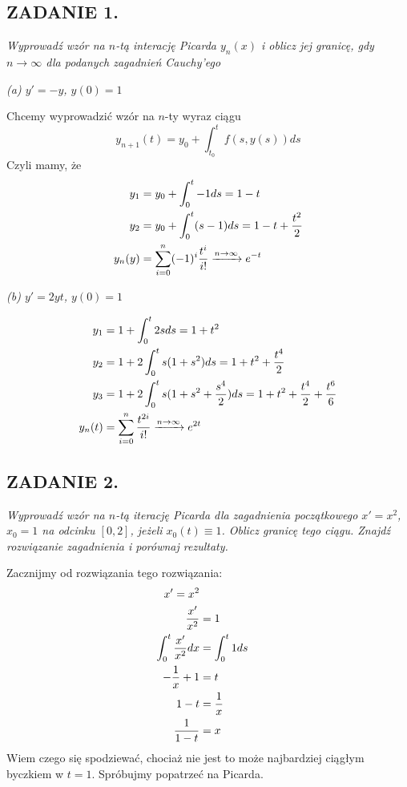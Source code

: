 \documentclass{article}
\begin{document}
\subsection*{ZADANIE 1.}
\emph{\color{pink}Wyprowadź wzór na $n$-tą interację Picarda $y_n(x)$ i oblicz jej granicę, gdy $n\to\infty$ dla podanych zagadnień Cauchy'ego}

\emph{\color{pink}(a) $y'=-y$, $y(0)=1$}

Chcemy wyprowadzić wzór na $n$-ty wyraz ciągu
$$y_{n+1}(t)=y_0+\int_{t_0}^tf(s, y(s))ds$$
Czyli mamy, że
\begin{align*}
    y_1&=y_0+\int_0^t-1ds=1-t\\
    y_2&=y_0+\int_0^t(s-1)ds=1-t+{t^2\over2}\\
    y_n(y)&=\sum\limits_{i=0}^n(-1)^i{t^i\over i!}\xrightarrow[]{n\to\infty}e^{-t}
\end{align*}

\emph{\color{pink}(b) $y'=2yt$, $y(0)=1$}

\begin{align*}
    y_1&=1+\int_0^t2sds=1+t^2\\
    y_2&=1+2\int_0^ts(1+s^2)ds=1+t^2+{t^4\over 2}\\
    y_3&=1+2\int_0^ts(1+s^2+{s^4\over2})ds=1+t^2+{t^4\over 2}+{t^6\over 6}\\
    y_n(t)&=\sum\limits_{i=0}^n{t^{2i}\over i!}\xrightarrow[]{n\to\infty}e^{2t}
\end{align*}

\subsection*{ZADANIE 2.}
\emph{\color{pink}Wyprowadź wzór na $n$-tą iterację Picarda dla zagadnienia początkowego $x'=x^2$, $x_0=1$ na odcinku $[0, 2]$, jeżeli $x_0(t)\equiv 1$. Oblicz granicę tego ciągu. Znajdź rozwiązanie zagadnienia i porównaj rezultaty.}

Zacznijmy od rozwiązania tego rozwiązania:
\begin{align*}
    x'=x^2\\
    {x'\over x^2}&=1\\
    \int_0^t{x'\over x^2}dx&=\int_0^t1ds\\
    -\frac1x+1&=t\\
    1-t&=\frac1x\\
    {1\over 1-t}&=x
\end{align*}
Wiem czego się spodziewać, chociaż nie jest to może najbardziej ciągłym byczkiem w $t=1$. Spróbujmy popatrzeć na Picarda.
\end{document}
